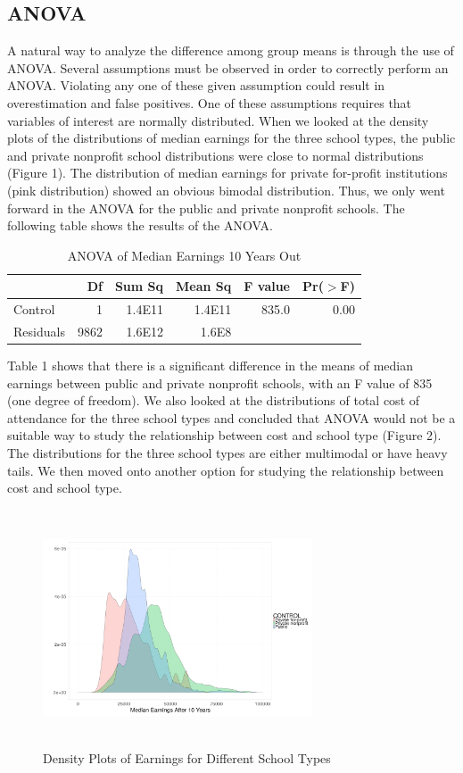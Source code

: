\documentclass[%
 reprint,
 amsmath,amssymb,
 aps,
]{revtex4-1}
\begin{document}
\subsection{\label{sec:level2}ANOVA}
A natural way to analyze the difference among group means is through the use of ANOVA.  Several assumptions must be observed in order to correctly perform an ANOVA.  Violating any one of these given assumption could result in overestimation and false positives.  One of these assumptions requires that variables of interest are normally distributed.  When we looked at the density plots of the distributions of median earnings for the three school types, the public and private nonprofit school distributions were close to normal distributions (Figure 1).  The distribution of median earnings for private for-profit institutions (pink distribution) showed an obvious bimodal distribution.  Thus, we only went forward in the ANOVA for the public and private nonprofit schools.  The following table shows the results of the ANOVA.

\begin{table}[ht]
	\caption{ANOVA of Median Earnings 10 Years Out}
	\label{Table 1}
	\centering
	\begin{tabular}{lrrrrr}
		  \hline
		   & Df & Sum Sq & Mean Sq & F value & Pr($>$F) \\ 
		     \hline
		     Control & 1 & 1.4E11 & 1.4E11 & 835.0 & 0.00 \\ 
		       Residuals & 9862 & 1.6E12 & 1.6E8 &  &  \\ 
		          \hline
	\end{tabular}
\end{table}


Table 1 shows that there is a significant difference in the means of median earnings between public and private nonprofit schools, with an F value of 835 (one degree of freedom).  We also looked at the distributions of total cost of attendance for the three school types and concluded that ANOVA would not be a suitable way to study the relationship between cost and school type (Figure 2).  The distributions for the three school types are either multimodal or have heavy tails.  We then moved onto another option for studying the relationship between cost and school type.

\begin{figure}[h]
\caption{Density Plots of Earnings for Different School Types}
\includegraphics[width=8cm, height=7cm]{earnings.png}
\end{figure}
\end{document}
